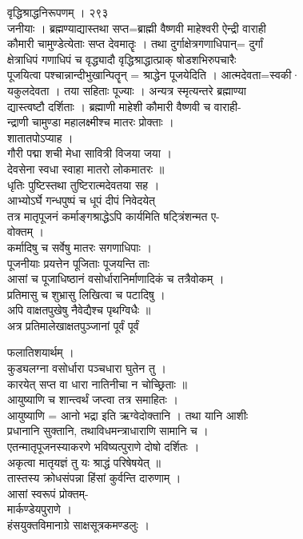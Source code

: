 \documentclass[11pt, openany]{book}
\begin{document}
{{ वृद्धिश्राद्धनिरूपणम् । २९३\\
जनीयाः । ब्रह्मण्याद्यास्तथा सप्त=ब्राह्मी वैष्णवी माहेश्वरी ऐन्द्री
वाराही\\
कौमारी चामुण्डेत्येताः सप्त देवमातॄः । तथा दुर्गाक्षेत्रगणाधिपान्=
दुर्गां\\
क्षेत्राधिपं गणाधिपं च वृद्ध्यादौ वृद्धिश्राद्धात्प्राक्
षोडशभिरुपचारैः\\
पूजयित्वा पश्चान्नान्दीभुखान्पितॄन् = श्राद्धेन पूजयेदिति ।
आत्मदेवता=स्वकी·\\
यकुलदेवता । तया सहिताः पूज्याः । अन्यत्र स्मृत्यन्तरे ब्रह्माण्या\\
द्यास्त्वष्टौ दर्शिताः । ब्रह्माणी माहेशी कौमारी वैष्णवी च वाराही-\\
न्द्राणी चामुण्डा महालक्ष्मीश्च मातरः प्रोक्ताः ।\\
शातातपोऽप्याह ।\\
गौरी पद्मा शची मेधा सावित्री विजया जया ।\\
देवसेना स्वधा स्वाहा मातरो लोकमातरः ॥\\
धृतिः पुष्टिस्तथा तुष्टिरात्मदेवतया सह ।\\
आभ्योऽर्घे गन्धपुष्पं च धूपं दीपं निवेदयेत् \textbar{}\\
तत्र मातृपूजनं कर्माङ्गश्राद्धेऽपि कार्यमिति षट्त्रिंशन्मत ए-\\
वोक्तम् ।\\
कर्मादिषु च सर्वेषु मातरः सगणाधिपाः ।\\
पूजनीयाः प्रयत्तेन पूजिताः पूजयन्ति ताः \textbar{}\textbar{}\\
आसां च पूजाधिष्ठानं वसोर्धारानिर्माणादिकं च तत्रैवोकम् ।\\
प्रतिमासु च शुभ्रासु लिखित्वा च पटादिषु ।\\
अपि वाक्षतपुखेषु नैवेद्यैश्च पृथग्विधैः ॥\\
अत्र प्रतिमालेखाक्षतपुञ्जानां }{पूर्वं}{ }{पूर्वं}{ फलातिशयार्थम् ।\\
कुड्यलग्ना वसोर्धारा पञ्चधारा घुतेन तु ।\\
कारयेत् सप्त वा धारा नातिनीचा न चोच्छ्रिताः ॥\\
आयुष्याणि च शान्त्वर्थं जप्त्वा तत्र समाहितः ।\\
आयुष्याणि = आनो भद्रा इति ऋग्वेदोक्तानि । तथा यानि आशीः\\
प्रधानानि सुक्तानि, तथाविधमन्त्राधाराणि सामानि च ।\\
एतन्मातृपूजनस्याकरणे भविष्यत्पुराणे दोषो दर्शितः ।\\
अकृत्वा मातृयज्ञं तु यः श्राद्धं परिषेषयेत् ॥\\
तास्तस्य क्रोधसंपन्ना हिंसां कुर्वन्ति दारुणाम् ।\\
आसां स्वरूपं प्रोक्तम्-\\
मार्कण्डेयपुराणे ।\\
हंसयुक्तविमानाग्रे साक्षसूत्रकमण्डलुः ।

}}
\end{document}

